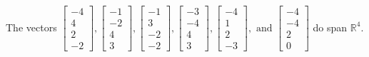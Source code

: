 \begin{exercise}
\begin{exerciseStatement}
  \end{exerciseStatement}
  \begin{exerciseAnswer}
   The vectors \(\left[\begin{array}{r}
-4 \\
4 \\
2 \\
-2
\end{array}\right] , \left[\begin{array}{r}
-1 \\
-2 \\
4 \\
3
\end{array}\right] , \left[\begin{array}{r}
-1 \\
3 \\
-2 \\
-2
\end{array}\right] , \left[\begin{array}{r}
-3 \\
-4 \\
4 \\
3
\end{array}\right] , \left[\begin{array}{r}
-4 \\
1 \\
2 \\
-3
\end{array}\right] , \text{ and } \left[\begin{array}{r}
-4 \\
-4 \\
2 \\
0
\end{array}\right]\) 
  	 do  
	span \(\mathbb{R}^4\).
  


  \end{exerciseAnswer}
\end{exercise}